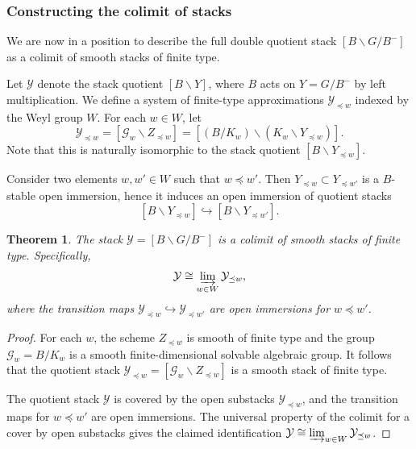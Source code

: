 \documentclass{amsart}
\newtheorem{Thm}{Theorem}[section]
\theoremstyle{definition}
\numberwithin{equation}{section}
\begin{document}
\subsubsection{Constructing the colimit of stacks}

We are now in a position to describe the full double quotient stack $[B \backslash G /
B^-]$ as a colimit of smooth stacks of finite type.

Let $\mathcal{Y}$ denote the stack quotient $[B \backslash Y]$, where $B$ acts on
$Y = G/B^-$ by left multiplication. We define a system of finite-type approximations
$\mathcal{Y}_{\preceq w}$ indexed by the Weyl group $W$. For each $w \in W$, let
\[
\mathcal{Y}_{\preceq w} = [\mathcal{G}_w \backslash Z_{\preceq w}]
= [(B/K_w) \backslash (K_w \backslash Y_{\preceq w})].
\]
Note that this is naturally isomorphic to the stack quotient $[B \backslash Y_{\preceq w}]$.

Consider two elements $w, w' \in W$ such that $w \preceq w'$. Then $Y_{\preceq w} \subset Y_{\preceq
w'}$ is a $B$-stable open immersion, hence it induces an open immersion of quotient stacks
\[
[B \backslash Y_{\preceq w}] \hookrightarrow [B \backslash Y_{\preceq w'}].
\]

\begin{Thm}\label{thm:Y-colimit}
The stack $\mathcal{Y} = [B \backslash G / B^-]$ is a colimit of smooth stacks of finite
type. Specifically,
\[
\mathcal{Y} \cong \varinjlim_{w \in W} \mathcal{Y}_{\preceq w},
\]
where the transition maps $\mathcal{Y}_{\preceq w} \hookrightarrow \mathcal{Y}_{\preceq w'}$ are open
immersions for $w \preceq w'$.
\end{Thm}

\begin{proof}
For each $w$, the scheme $Z_{\preceq w}$ is smooth of finite type and the group
$\mathcal{G}_w=B/K_w$ is a smooth finite-dimensional solvable algebraic group. It follows
that the quotient stack $\mathcal{Y}_{\preceq w} = [\mathcal{G}_w \backslash Z_{\preceq w}]$ is a smooth stack of
finite type.

The quotient stack $\mathcal{Y}$ is covered by the open substacks $\mathcal{Y}_{\preceq w}$, and
the transition maps for $w\preceq w'$ are open immersions. The universal property of the
colimit for a cover by open substacks gives the claimed identification
$\mathcal{Y} \cong \varinjlim_{w\in W} \mathcal{Y}_{\preceq w}$.
\end{proof}
\end{document}
